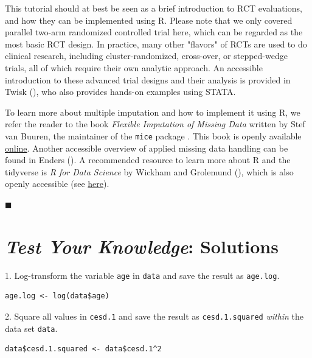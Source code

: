 This tutorial should at best be seen as a brief introduction to RCT evaluations, and how they can be implemented using \textsf{R}. Please note that we only covered parallel two-arm randomized controlled trial here, which can be regarded as the most basic RCT design. In practice, many other "flavors" of RCTs are used to do clinical research, including cluster-randomized, cross-over, or stepped-wedge trials, all of which require their own analytic approach. An accessible introduction to these advanced trial designs and their analysis is provided in Twisk (\citeyear{twiskbook}), who also provides hands-on examples using STATA. 

To learn more about multiple imputation and how to implement it using \textsf{R}, we refer the reader to the book \emph{Flexible Imputation of Missing Data} written by Stef van Buuren, the maintainer of the \texttt{mice} package \citep{fimd}. This book is openly available \href{https://stefvanbuuren.name/fimd/}{online}. Another accessible overview of applied missing data handling can be found in Enders (\citeyear{enders2022applied}). A recommended resource to learn more about \textsf{R} and the tidyverse is \emph{R for Data Science} by Wickham and Grolemund (\citeyear{wickham2016r}), which is also openly accessible (see \href{https://r4ds.had.co.nz/}{here}). 

\begin{flushright}
    $\blacksquare$
\end{flushright}

\newpage



\newpage

\section{\emph{Test Your Knowledge}: Solutions}

1. Log-transform the variable \texttt{age} in \texttt{data} and save the result as \texttt{age.log}.

\begin{lstlisting}
age.log <- log(data$age)
\end{lstlisting}

2. Square all values in \texttt{cesd.1} and save the result as \texttt{cesd.1.squared} \emph{within} the data set \texttt{data}.

\begin{lstlisting}
data$cesd.1.squared <- data$cesd.1^2
\end{lstlisting}

